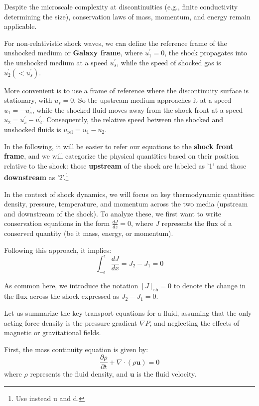 Despite the microscale complexity at discontinuities (e.g., finite conductivity determining the size), conservation laws of mass, momentum, and energy remain applicable.

For non-relativistic shock waves, we can define the reference frame of the unshocked medium or \textbf{Galaxy frame}, where \( u^\prime_1 = 0 \),
the shock propagates into the unshocked medium at a speed \( u^\prime_s \), while the speed of shocked gas is \( u^\prime_2 (< u^\prime_s) \).

More convenient is to use a frame of reference  where the discontinuity surface is stationary, with \( u_s = 0 \). So the upstream medium approaches it at a speed \( u_1 = -u^\prime_s \), while the shocked fluid moves away from the shock front at a speed \( u_2 = u^\prime_s - u^\prime_2 \).
%
Consequently, the relative speed between the shocked and unshocked fluids is \( u_{\text{rel}} = u_1 - u_2 \).

In the following, it will be easier to refer our equations to the \textbf{shock front frame}, and we will categorize the physical quantities based on their position relative to the shock: those \textbf{upstream} of the shock are labeled as '1' and those \textbf{downstream} as '2'.\footnote{Use instead u and d.}

In the context of shock dynamics, we will focus on key thermodynamic quantities: density, pressure, temperature, and momentum across the two media (upstream and downstream of the shock). To analyze these, we first want to write conservation equations in the form \( \frac{dJ}{dz} = 0 \), where \( J \) represents the flux of a conserved quantity (be it mass, energy, or momentum).

Following this approach, it implies:
%
\begin{equation}
\int_{-\epsilon}^{\epsilon} \frac{dJ}{dx} = J_2 - J_1 = 0
\end{equation}

As common here, we introduce the notation \( [J]_{\text{sh}} = 0\) to denote the change in the flux across the shock expressed as \( J_2 - J_1 = 0 \). 

Let us summarize the key transport equations for a fluid, assuming that the only acting force density is the pressure gradient \( \nabla P \), and neglecting the effects of magnetic or gravitational fields.

First, the mass continuity equation is given by:
%
\begin{equation}
\frac{\partial \rho}{\partial t} + \nabla \cdot (\rho \mathbf{u}) = 0
\end{equation}
%
where \( \rho \) represents the fluid density, and \( \mathbf{u} \) is the fluid velocity.

